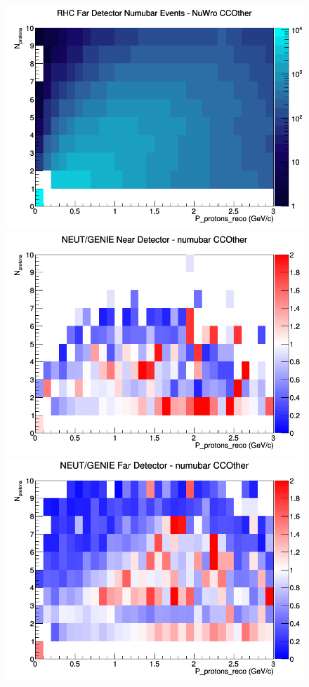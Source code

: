 \documentclass[12pt]{article}
\begin{document}
\begin{figure}[h]
\endminipage
{}
\includegraphics[width=\linewidth]{eff_N_P/FGT/protons/CCOther_RHC_FD_numubar_N_P_NuWro.png}
\endminipage
\newline
{}
\includegraphics[width=\linewidth]{eff_N_P/FGT/protons/ratios/CCOther_NEUT_GENIE_numubar_near_N_P.png}
\endminipage
{}
\includegraphics[width=\linewidth]{eff_N_P/FGT/protons/ratios/CCOther_NEUT_GENIE_numubar_far_N_P.png}

\end{figure}
\end{document}
